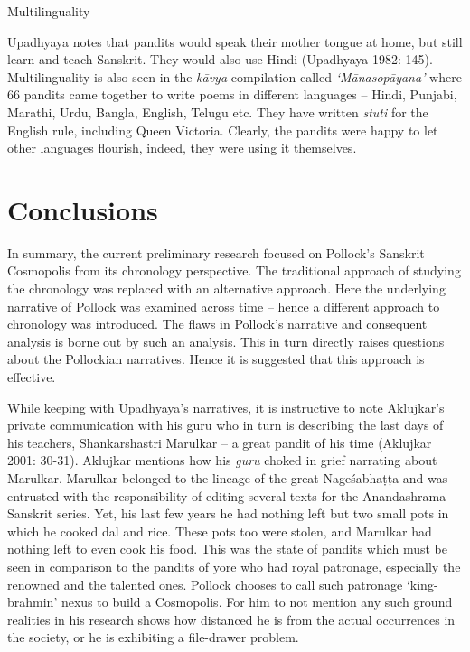 Multilinguality

Upadhyaya notes that pandits would speak their mother tongue at home, but still learn and teach Sanskrit. They would also use Hindi (Upadhyaya 1982: 145). Multilinguality is also seen in the \textit{kāvya} compilation called \textit{‘Mānasopāyana’} where 66 pandits came together to write poems in different languages – Hindi, Punjabi, Marathi, Urdu, Bangla, English, Telugu etc. They have written \textit{stuti} for the English rule, including Queen Victoria. Clearly, the pandits were happy to let other languages flourish, indeed, they were using it themselves.

\vspace{-.4cm}

\section*{Conclusions}

In summary, the current preliminary research focused on Pollock’s Sanskrit Cosmopolis from its chronology perspective. The traditional approach of studying the chronology was replaced with an alternative approach. Here the underlying narrative of Pollock was examined across time – hence a different approach to chronology was introduced. The flaws in Pollock’s narrative and consequent analysis is borne out by such an analysis. This in turn directly raises questions about the Pollockian narratives. Hence it is suggested that this approach is effective.

While keeping with Upadhyaya’s narratives, it is instructive to note Aklujkar’s private communication with his guru who in turn is describing the last days of his teachers, Shankarshastri Marulkar – a great pandit of his time (Aklujkar 2001: 30-31). Aklujkar mentions how his \textit{guru} choked in grief narrating about Marulkar. Marulkar belonged to the lineage of the great Nageśabhaṭṭa and was entrusted with the responsibility of editing several texts for the Anandashrama Sanskrit series. Yet, his last few years he had nothing left but two small pots in which he cooked dal and rice. These pots too were stolen, and Marulkar had nothing left to even cook his food. This was the state of pandits which must be seen in comparison to the pandits of yore who had royal patronage, especially the renowned and the talented ones. Pollock chooses to call such patronage ‘king-brahmin’ nexus to build a Cosmopolis. For him to not mention any such ground realities in his research shows how distanced he is from the actual occurrences in the society, or he is exhibiting a file-drawer problem.

